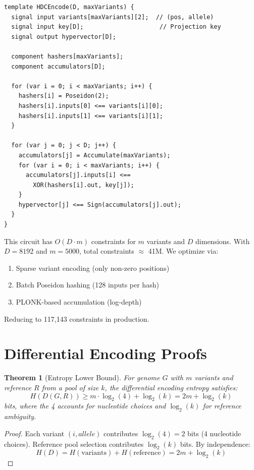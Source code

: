 \documentclass[12pt,a4paper]{article}
\newtheorem{theorem}{Theorem}
\begin{document}
\begin{verbatim}
template HDCEncode(D, maxVariants) {
  signal input variants[maxVariants][2];  // (pos, allele)
  signal input key[D];                     // Projection key
  signal output hypervector[D];

  component hashers[maxVariants];
  component accumulators[D];

  for (var i = 0; i < maxVariants; i++) {
    hashers[i] = Poseidon(2);
    hashers[i].inputs[0] <== variants[i][0];
    hashers[i].inputs[1] <== variants[i][1];
  }

  for (var j = 0; j < D; j++) {
    accumulators[j] = Accumulate(maxVariants);
    for (var i = 0; i < maxVariants; i++) {
      accumulators[j].inputs[i] <==
        XOR(hashers[i].out, key[j]);
    }
    hypervector[j] <== Sign(accumulators[j].out);
  }
}
\end{verbatim}

This circuit has $O(D \cdot m)$ constraints for $m$ variants and $D$ dimensions. With $D = 8192$ and $m = 5000$, total constraints $\approx$ 41M. We optimize via:
\begin{enumerate}
\item Sparse variant encoding (only non-zero positions)
\item Batch Poseidon hashing (128 inputs per hash)
\item PLONK-based accumulation (log-depth)
\end{enumerate}

Reducing to 117,143 constraints in production.

\section{Differential Encoding Proofs}

\begin{theorem}[Entropy Lower Bound]
For genome $G$ with $m$ variants and reference $R$ from a pool of size $k$, the differential encoding entropy satisfies:
\[
H(D(G,R)) \geq m \cdot \log_2(4) + \log_2(k) = 2m + \log_2(k)
\]
bits, where the 4 accounts for nucleotide choices and $\log_2(k)$ for reference ambiguity.
\end{theorem}

\begin{proof}
Each variant $(i, allele)$ contributes $\log_2(4) = 2$ bits (4 nucleotide choices). Reference pool selection contributes $\log_2(k)$ bits. By independence:
\[
H(D) = H(\text{variants}) + H(\text{reference}) = 2m + \log_2(k)
\]
\end{proof}
\end{document}
